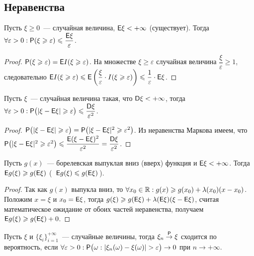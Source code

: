 \subsection*{Неравенства}
\begin{lemma}
	Пусть $\xi \geqslant 0$~--- случайная величина, $\E \xi < +\infty$ (существует). Тогда $\forall \varepsilon > 0: \P (\xi \geqslant \varepsilon ) \leqslant \dfrac{\E \xi}{\varepsilon}$.
	\begin{proof}
		$\P (\xi \geqslant \varepsilon ) = \E I(\xi \geqslant \varepsilon)$. На множестве ${ \xi \geqslant \varepsilon}$ случайная величина $\dfrac{\xi}{\varepsilon} \geqslant 1$, следовательно $\E I(\xi \geqslant \varepsilon) \leqslant \E \left( \dfrac{\xi}{\varepsilon} \cdot I (\xi \geqslant \varepsilon) \right) \leqslant \dfrac{1}{\varepsilon} \cdot  \E \xi$.
	\end{proof}
\end{lemma}
\begin{lemma}
	Пусть $\xi$~--- случайная величина такая, что $\D \xi < + \infty$, тогда $\forall \varepsilon > 0: \P \big(|\xi - \E \xi | \geqslant \varepsilon \big) \leqslant \dfrac{\D \xi}{\varepsilon^2}$.
	\begin{proof}
		$\P \big(|\xi - \E \xi | \geqslant \varepsilon\big) = \P \big( | \xi - \E \xi |^2 \geqslant \varepsilon^2 \big)$. Из неравенства Маркова имеем, что $\P \big( | \xi - \E \xi |^2 \geqslant \varepsilon^2 \big) \leqslant \dfrac{\E (\xi - \E \xi )^2}{\varepsilon^2} = \dfrac{\D \xi}{\varepsilon^2}$.
	\end{proof} 
\end{lemma}
\begin{lemma}
	Пусть $g(x)$~--- борелевская выпуклая вниз (вверх) функция и $\E \xi < +\infty$. Тогда $\E g(\xi) \geqslant g(\E \xi )$ (~$\E g(\xi) \leqslant g(\E \xi )$\,).
	\begin{proof}
		Так как $g(x)$ выпукла вниз, то $\forall x_0 \in \R : g(x) \geqslant g(x_0) + \lambda(x_0)(x - x_0)$. Положим $x = \xi$ и $x_0 = \E \xi$, тогда $g(\xi) \geqslant g(\E \xi) + \lambda(\E \xi)(\xi - \E \xi)$, считая математическое ожидание от обоих частей неравенства, получаем $\E g(\xi) \geqslant g( \E \xi ) + 0$.
	\end{proof}
\end{lemma}
\begin{definition}
	Пусть $\xi$ и $\{\xi_i\}_{i=1}^{+\infty}$~--- случайные величины, тогда $\xi_n \overset{\P}{\rightarrow} \xi$ сходится по вероятность, если $\forall \varepsilon > 0 : \P \big(\omega : | \xi_n (\omega) - \xi ( \omega ) | > \varepsilon \big) \rightarrow 0$ при $n \rightarrow +\infty$.
\end{definition}
